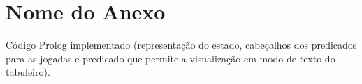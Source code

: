 \documentclass[a4paper]{article}
\begin{document}
\clearpage
{}
\renewcommand\refname{Bibliografia}



\newpage
\appendix
\section{Nome do Anexo}
Código Prolog implementado (representação do estado, cabeçalhos dos predicados para as jogadas e predicado que permite a visualização em modo de texto do tabuleiro).
\end{document}
